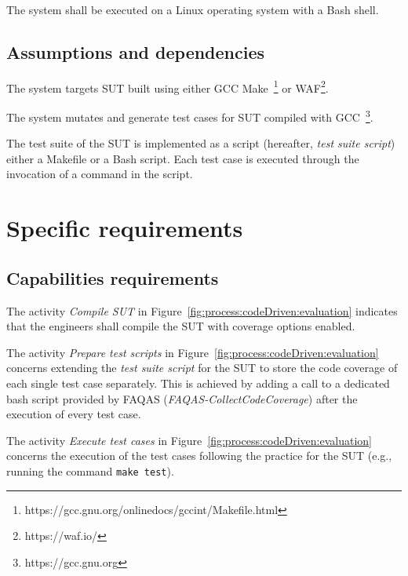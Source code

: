 \RQ{} The system shall be executed on a Linux operating system with a Bash shell.



\subsection{Assumptions and dependencies}

\RQ{} The system targets SUT built using either GCC Make~\footnote{https://gcc.gnu.org/onlinedocs/gccint/Makefile.html} or WAF\footnote{https://waf.io/}.

\RQ{} The system mutates and generate test cases for SUT compiled with GCC~\footnote{https://gcc.gnu.org}.

\RQ{} The test suite of the SUT is implemented as a script (hereafter, \emph{test suite script}) either a Makefile or a Bash script. Each test case is executed through the invocation of a command in the script.

\section{Specific requirements}
\subsection{Capabilities requirements}
\label{sec:rquirements:capabilities}


\RQ{} The activity \emph{Compile SUT} in Figure~\ref{fig:process:codeDriven:evaluation} indicates that the engineers shall compile  the SUT with coverage options enabled.

\RQ{} The activity \emph{Prepare test scripts} in Figure~\ref{fig:process:codeDriven:evaluation} concerns extending the \emph{test suite script} for the SUT to store the code coverage of each single test case separately. This is achieved by adding a call to a dedicated bash script provided by FAQAS (\emph{FAQAS-CollectCodeCoverage}) after the execution of every test case.

\RQ{} The activity \emph{Execute test cases} in Figure~\ref{fig:process:codeDriven:evaluation} concerns the execution of the test cases following the practice for the SUT (e.g., running the command \texttt{make test}).

